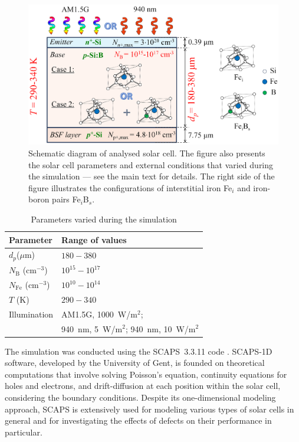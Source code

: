 \documentclass[a4paper,fleqn]{cas-sc}
\begin{document}
\begin{figure}
	\centering
		\includegraphics[width=0.65\linewidth]{Fig1.png}
	  \caption{Schematic diagram of analysed solar cell.
       The figure also presents the solar cell parameters and external conditions that varied during the simulation --- see the main text for details.
      The right side of the figure illustrates the configurations of interstitial iron Fe$_i$ and iron-boron pairs Fe$_i$B$_s$.}\label{fig1}
\end{figure}


\begin{table}
\caption{Parameters varied during the simulation}\label{table1}
\begin{tabular*}{\tblwidth}{@{}LL@{}}
\toprule
  Parameter & Range of values \\ %
\midrule
 $d_p$($\mu$m)   & $180-380$\\
 $N_\mathrm{B}$ (cm$^{-3}$)    & $10^{15} - 10^{17}$\\
 $N_\mathrm{Fe}$ (cm$^{-3}$) & $10^{10} - 10^{14}$\\
 $T$ (K)                        & $290 - 340$\\
 Illumination                 & AM1.5G, 1000~W/$\mathrm{m}^{2}$; \\
 & 940~$\mathrm{nm}$, 5~W/$\mathrm{m}^{2}$; 940~$\mathrm{nm}$, 10~W/$\mathrm{m}^{2}$\\
\bottomrule
\end{tabular*}
\end{table}


The simulation was conducted using the SCAPS~3.3.11 code \cite{SCAPS1}.
SCAPS-1D software, developed by the University of Gent, is founded on theoretical computations that involve solving Poisson's equation,
continuity equations for holes and electrons, and drift-diffusion at each position within the solar cell,
considering the boundary conditions.
Despite its one-dimensional modeling approach, SCAPS is extensively used for modeling various types
of solar cells \cite{MasumMia2025,Rahman2024,Sultana2024,Joshi2024,Ravidas2024,Liu2024,You2023} in general
and for investigating the effects of defects on their performance \cite{MasumMia2025,Sultana2024,AitAbdelkadir2023,Liang2024,SCAPSDefect3} in particular.
\end{document}
